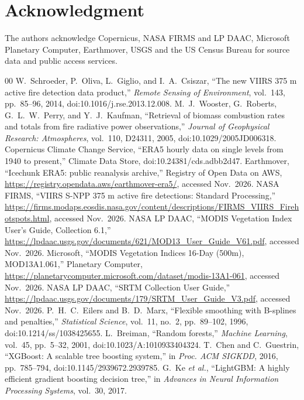 \documentclass[conference]{IEEEtran}
\begin{document}
\section*{Acknowledgment}
The authors acknowledge Copernicus, NASA FIRMS and LP DAAC, Microsoft Planetary Computer, Earthmover, USGS and the US Census Bureau for source data and public access services.

\begin{thebibliography}{00}
 W.~Schroeder, P.~Oliva, L.~Giglio, and I.~A.~Csiszar, ``The new VIIRS 375 m active fire detection data product,'' \emph{Remote Sensing of Environment}, vol.~143, pp.~85--96, 2014, doi:10.1016/j.rse.2013.12.008.
 M.~J.~Wooster, G.~Roberts, G.~L.~W.~Perry, and Y.~J.~Kaufman, ``Retrieval of biomass combustion rates and totals from fire radiative power observations,'' \emph{Journal of Geophysical Research: Atmospheres}, vol.~110, D24311, 2005, doi:10.1029/2005JD006318.
 Copernicus Climate Change Service, ``ERA5 hourly data on single levels from 1940 to present,'' Climate Data Store, doi:10.24381/cds.adbb2d47.
 Earthmover, ``Icechunk ERA5: public reanalysis archive,'' Registry of Open Data on AWS, \url{https://registry.opendata.aws/earthmover-era5/}, accessed Nov.~2026.
 NASA FIRMS, ``VIIRS S-NPP 375 m active fire detections: Standard Processing,'' \url{https://firms.modaps.eosdis.nasa.gov/content/descriptions/FIRMS_VIIRS_Firehotspots.html}, accessed Nov.~2026.
 NASA LP DAAC, ``MODIS Vegetation Index User's Guide, Collection 6.1,'' \url{https://lpdaac.usgs.gov/documents/621/MOD13_User_Guide_V61.pdf}, accessed Nov.~2026.
 Microsoft, ``MODIS Vegetation Indices 16-Day (500m), MOD13A1.061,'' Planetary Computer, \url{https://planetarycomputer.microsoft.com/dataset/modis-13A1-061}, accessed Nov.~2026.
 NASA LP DAAC, ``SRTM Collection User Guide,'' \url{https://lpdaac.usgs.gov/documents/179/SRTM_User_Guide_V3.pdf}, accessed Nov.~2026.
 P.~H.~C.~Eilers and B.~D.~Marx, ``Flexible smoothing with B-splines and penalties,'' \emph{Statistical Science}, vol.~11, no.~2, pp.~89--102, 1996, doi:10.1214/ss/1038425655.
 L.~Breiman, ``Random forests,'' \emph{Machine Learning}, vol.~45, pp.~5--32, 2001, doi:10.1023/A:1010933404324.
 T.~Chen and C.~Guestrin, ``XGBoost: A scalable tree boosting system,'' in \emph{Proc. ACM SIGKDD}, 2016, pp.~785--794, doi:10.1145/2939672.2939785.
 G.~Ke \emph{et al.}, ``LightGBM: A highly efficient gradient boosting decision tree,'' in \emph{Advances in Neural Information Processing Systems}, vol.~30, 2017.
\end{thebibliography}
\end{document}

